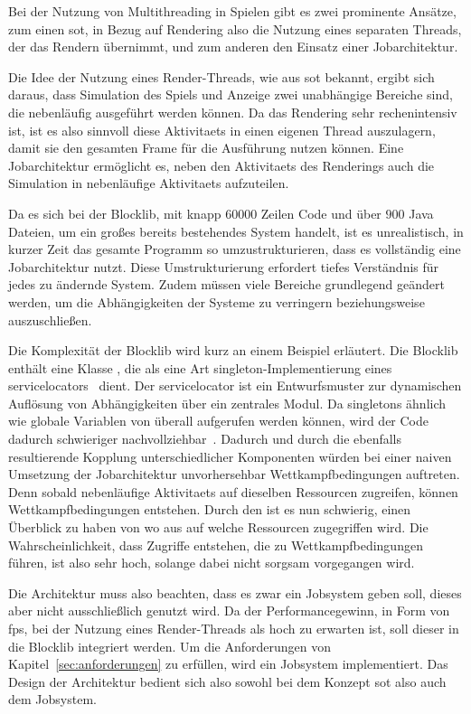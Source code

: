 Bei der Nutzung von Multithreading in Spielen gibt es zwei prominente Ansätze, zum einen \ac{sot}, in Bezug auf Rendering also die Nutzung eines separaten Threads, der das Rendern übernimmt, und zum anderen den Einsatz einer Jobarchitektur.

Die Idee der Nutzung eines Render-Threads, wie aus \ac{sot} bekannt, ergibt sich daraus, dass Simulation des Spiels und Anzeige zwei unabhängige Bereiche sind, die nebenläufig ausgeführt werden können. Da das Rendering sehr rechenintensiv ist, ist es also sinnvoll diese \glspl{Aktivitaet} in einen eigenen Thread auszulagern, damit sie den gesamten Frame für die Ausführung nutzen können. Eine Jobarchitektur ermöglicht es, neben den \glspl{Aktivitaet} des Renderings auch die Simulation in nebenläufige \glspl{Aktivitaet} aufzuteilen. 

Da es sich bei der Blocklib, mit knapp $60000$ Zeilen Code und über $900$ Java Dateien, um ein großes bereits bestehendes System handelt, ist es unrealistisch, in kurzer Zeit das gesamte \gls{Programm} so umzustrukturieren, dass es vollständig eine Jobarchitektur nutzt. Diese Umstrukturierung erfordert tiefes Verständnis für jedes zu ändernde System. Zudem müssen viele Bereiche grundlegend geändert werden, um die Abhängigkeiten der Systeme zu verringern beziehungsweise auszuschließen.

Die Komplexität der Blocklib wird kurz an einem Beispiel erläutert. Die Blocklib enthält eine Klasse \classContext{}, die als eine Art \gls{singleton}-Implementierung eines \glspl{servicelocator}~\cite[S.~301~ff.]{Nystrom2015} dient. Der \gls{servicelocator} ist ein Entwurfsmuster zur dynamischen Auflösung von Abhängigkeiten über ein zentrales Modul. Da \glspl{singleton} ähnlich wie globale Variablen von überall aufgerufen werden können, wird der Code dadurch schwieriger nachvollziehbar~\cite[S.~108]{Nystrom2015}. Dadurch und durch die ebenfalls resultierende Kopplung unterschiedlicher Komponenten würden bei einer naiven Umsetzung der Jobarchitektur unvorhersehbar Wettkampfbedingungen auftreten.
Denn sobald nebenläufige \glspl{Aktivitaet} auf dieselben Ressourcen zugreifen, können Wettkampfbedingungen entstehen. Durch den \classContext{} ist es nun schwierig, einen Überblick zu haben von wo aus auf welche Ressourcen zugegriffen wird. Die Wahrscheinlichkeit, dass Zugriffe entstehen, die zu Wettkampfbedingungen führen, ist also sehr hoch, solange dabei nicht sorgsam vorgegangen wird.

Die Architektur muss also beachten, dass es zwar ein Jobsystem geben soll, dieses aber nicht ausschließlich genutzt wird. Da der Performancegewinn, in Form von \ac{fps}, bei der Nutzung eines Render-Threads als hoch zu erwarten ist, soll dieser in die Blocklib integriert werden. Um die Anforderungen von Kapitel~\ref{sec:anforderungen} zu erfüllen, wird ein Jobsystem implementiert. Das Design der Architektur bedient sich also sowohl bei dem Konzept \ac{sot} also auch dem Jobsystem.
